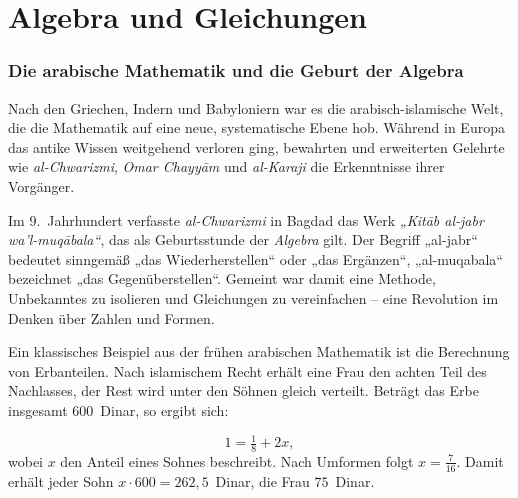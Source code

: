 
\chapter{Algebra und Gleichungen}
\label{chap:III_algebra}
\label{chap:III_qubit}
\setcounter{section}{3}
\setcounter{subsection}{0}
\setcounter{subsubsection}{1}
\setcounter{secnumdepth}{3}
\subsection{Die arabische Mathematik und die Geburt der Algebra}
\label{sec:3.1_arabische_mathematik}

Nach den Griechen, Indern und Babyloniern war es die arabisch-islamische Welt, 
die die Mathematik auf eine neue, systematische Ebene hob. 
Während in Europa das antike Wissen weitgehend verloren ging, 
bewahrten und erweiterten Gelehrte wie 
\emph{al-Chwarizmi}, 
\emph{Omar Chayyām} und 
\emph{al-Karaji} die Erkenntnisse ihrer Vorgänger. 

Im 9.~Jahrhundert verfasste \emph{al-Chwarizmi} in Bagdad das Werk 
\emph{„Kitāb al-jabr wa’l-muqābala“}, 
das als Geburtsstunde der \emph{Algebra} gilt. 
Der Begriff „al-jabr“ bedeutet sinngemäß „das Wiederherstellen“ oder „das Ergänzen“, 
„al-muqabala“ bezeichnet „das Gegenüberstellen“. 
Gemeint war damit eine Methode, Unbekanntes zu isolieren und Gleichungen zu vereinfachen – 
eine Revolution im Denken über Zahlen und Formen. 


Ein klassisches Beispiel aus der frühen arabischen Mathematik ist die Berechnung von Erbanteilen. 
Nach islamischem Recht erhält eine Frau den achten Teil des Nachlasses, 
der Rest wird unter den Söhnen gleich verteilt. 
Beträgt das Erbe insgesamt 600~Dinar, so ergibt sich:

\[
1 = \tfrac{1}{8} + 2x,
\]
wobei \(x\) den Anteil eines Sohnes beschreibt. 
Nach Umformen folgt \(x = \tfrac{7}{16}\). 
Damit erhält jeder Sohn \(x \cdot 600 = 262{,}5\)~Dinar, 
die Frau \(75\)~Dinar.

